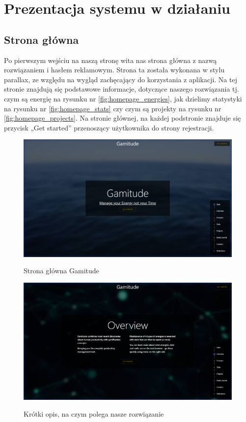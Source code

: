 \documentclass[a4paper,11pt]{report}
\begin{document}
\chapter{Prezentacja systemu w działaniu}
\section{Strona główna}
Po pierwszym wejściu na naszą stronę wita nas strona główna z nazwą rozwiązaniem i hasłem reklamowym. 
Strona ta została wykonana w stylu parallax, ze względu na wygląd zachęcający do korzystania z aplikacji.
Na tej stronie znajdują się podstawowe informacje, dotyczące naszego rozwiązania tj. czym są energię na rysunku nr \ref{fig:homepage_energies}, jak dzielimy statystyki na rysunku nr \ref{fig:homepage_stats} czy czym są projekty na rysunku nr \ref{fig:homepage_projects}.
Na stronie głównej, na każdej podstronie znajduje się przycisk „Get started” przenoszący użytkownika do strony rejestracji.
\begin{figure}[H]
	\centering
	\includegraphics[scale=0.3]{prezentacja/Homepage}\\
	\caption{Strona główna Gamitude}
	\label{fig:homepage}
\end{figure}
\begin{figure}[H]
	\centering
	\includegraphics[scale=0.3]{prezentacja/Homepage_Overview}\\
	\caption{Krótki opis, na czym polega nasze rozwiązanie}
	\label{fig:homepage_overview}
\end{figure}
\end{document}
